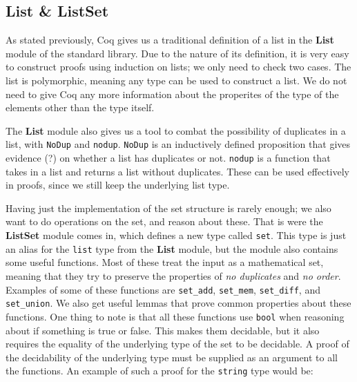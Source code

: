 
\subsection{List \& ListSet}

As stated previously, Coq gives us a traditional definition of a list in the \textbf{List} module of the standard library.
Due to the nature of its definition, it is very easy to construct proofs using induction on lists; we only need to check two cases.
The list is polymorphic, meaning any type can be used to construct a list. We do not need to give Coq any more information
about the properites of the type of the elements other than the type itself.

The \textbf{List} module also gives us a tool to combat the possibility of duplicates in a list,
with \lstinline[language=Coq]{NoDup} and \lstinline[language=Coq]{nodup}.
\lstinline[language=Coq]{NoDup} is an inductively defined proposition that gives evidence (?)
on whether a list has duplicates or not.
\lstinline[language=Coq]{nodup} is a function that takes in a list and returns a list without duplicates.
These can be used effectively in proofs, since we still keep the underlying list type.

Having just the implementation of the set structure is rarely enough; we also want to do operations on the set, and reason about these.
That is were the \textbf{ListSet} module comes in, which defines a new type called \lstinline[language=Coq]{set}.
This type is just an alias for the \lstinline[language=Coq]{list} type from the \textbf{List} module,
but the module also contains some useful functions.
Most of these treat the input as a mathematical set,
meaning that they try to preserve the properties of \textit{no duplicates} and \textit{no order}.
Examples of some of these functions are \lstinline[language=Coq]{set_add}, \lstinline[language=Coq]{set_mem},
\lstinline[language=Coq]{set_diff}, and \lstinline[language=Coq]{set_union}.
We also get useful lemmas that prove common properties about these functions.
One thing to note is that all these functions use \lstinline[language=Coq]{bool} when reasoning about if something is true or false.
This makes them decidable, but it also requires the equality of the underlying type of the set to be decidable.
A proof of the decidability of the underlying type must be supplied as an argument to all the functions.
An example of such a proof for the \lstinline[language=Coq]{string} type would be:

